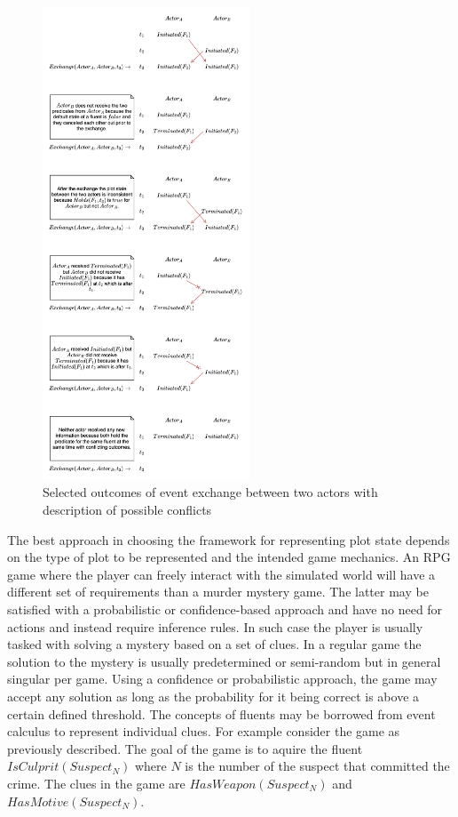 \begin{figure}
    \centering
    \includegraphics[width=0.55\textwidth]{images/temporal_conflicts_in_event_exchange.drawio.png}
    \caption{Selected outcomes of event exchange between two actors with description of possible conflicts}
    \label{fig:temporal_conflicts_in_event_exchange}
\end{figure}

The best approach in choosing the framework for representing plot state depends on the type of plot to be represented and the intended game mechanics.
An RPG game where the player can freely interact with the simulated world will have a different set of requirements than a murder mystery game.
The latter may be satisfied with a probabilistic or confidence-based approach and have no need for actions and instead require inference rules.
In such case the player is usually tasked with solving a mystery based on a set of clues.
In a regular game the solution to the mystery is usually predetermined or semi-random but in general singular per game.
Using a confidence or probabilistic approach, the game may accept any solution as long as the probability for it being correct is above a certain defined threshold.
The concepts of fluents may be borrowed from event calculus to represent individual clues.
For example consider the game as previously described.
The goal of the game is to aquire the fluent $IsCulprit \left( Suspect_N \right)$ where $N$ is the number of the suspect that committed the crime.
The clues in the game are $HasWeapon \left( Suspect_N \right)$ and $HasMotive \left( Suspect_N \right)$.

